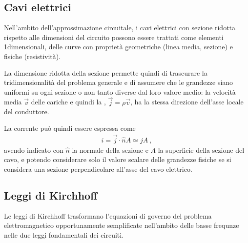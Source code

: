\documentclass[letterpaper,10pt,italian]{jupyterBook}
\begin{document}
\subsection{Cavi elettrici}
\label{\detokenize{ch/electromagnetism/circuits-electric:cavi-elettrici}}\label{\detokenize{ch/electromagnetism/circuits-electric:physics-hs-electromagnetism-circuits-electric-electric-cable}}
\sphinxAtStartPar
Nell’ambito dell’approssimazione circuitale, i cavi elettrici con sezione ridotta rispetto alle dimensioni del circuito possono essere trattati come elementi 1\sphinxhyphen{}dimensionali, delle curve con proprietà geometriche (linea media, sezione) e fisiche (resistività).

\sphinxAtStartPar
La dimensione ridotta della sezione permette quindi di trascurare la tridimensionalità del problema generale e di assumere che le grandezze siano uniformi su ogni sezione \sphinxhyphen{} o non tanto diverse dal loro valore medio: la velocità media  \(\vec{v}\) delle cariche e quindi la {\hyperref[\detokenize{ch/electromagnetism/electric-current:electric-current-density-def}]{}}, \(\vec{j} = \rho \vec{v}\), ha la stessa direzione dell’asse locale del conduttore.

\sphinxAtStartPar
La corrente può quindi essere espressa come
\begin{equation}\label{equation:ch/electromagnetism/circuits-electric:eq:cable:current-current-density}
\begin{split}i = \vec{j} \cdot \hat{n} A \simeq j A \ ,\end{split}
\end{equation}
\sphinxAtStartPar
avendo indicato con \(\hat{n}\) la normale della sezione e \(A\) la superficie della sezione del cavo, e potendo considerare solo il valore scalare delle grandezze fisiche se si considera una sezione perpendicolare all’asse del cavo elettrico.

\sphinxAtStartPar
{} 


\subsection{Leggi di Kirchhoff}
\label{\detokenize{ch/electromagnetism/circuits-electric:leggi-di-kirchhoff}}\label{\detokenize{ch/electromagnetism/circuits-electric:physics-hs-electromagnetism-circuits-electric-kirchhoff-laws}}
\sphinxAtStartPar
Le leggi di Kirchhoff trasformano l’equazioni di governo del problema elettromagnetico opportunamente semplificate nell’ambito delle basse frequnze nelle due leggi fondamentali dei circuiti.
\end{document}
